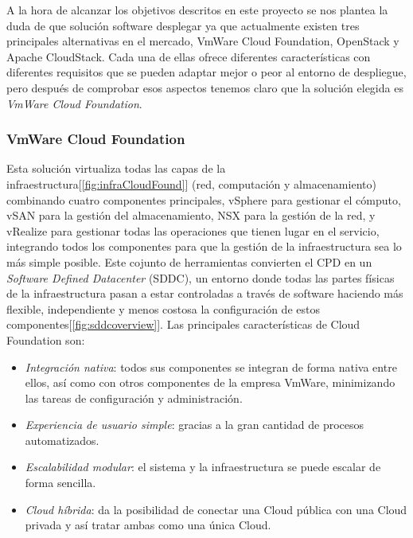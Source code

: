 A la hora de alcanzar los objetivos descritos en este proyecto se nos plantea la duda de que solución software desplegar ya que actualmente existen tres principales alternativas en el mercado, VmWare Cloud Foundation, OpenStack y Apache CloudStack. Cada una de ellas ofrece diferentes características con diferentes requisitos que se pueden adaptar mejor o peor al entorno de despliegue, pero después de comprobar esos aspectos tenemos claro que la solución elegida es \emph{VmWare Cloud Foundation}.

\subsubsection{VmWare Cloud Foundation}
Esta solución virtualiza todas las capas de la infraestructura[\ref{fig:infraCloudFound}] (red, computación y almacenamiento) combinando cuatro componentes principales, vSphere para gestionar el cómputo, vSAN para la gestión del almacenamiento, NSX para la gestión de la red, y vRealize para gestionar todas las operaciones que tienen lugar en el servicio, integrando todos los componentes para que la gestión de la infraestructura sea lo más simple posible. Este cojunto de herramientas convierten el CPD en un \emph{Software Defined Datacenter} (SDDC), un entorno donde todas las partes físicas de la infraestructura pasan a estar controladas a través de software haciendo más flexible, independiente y menos costosa la configuración de estos componentes[\ref{fig:sddcoverview}]. Las principales características de Cloud Foundation son:
\begin{itemize}
    \item \emph{Integración nativa}: todos sus componentes se integran de forma nativa entre ellos, así como con otros componentes de la empresa VmWare, minimizando las tareas de configuración y administración.
    \item \emph{Experiencia de usuario simple}: gracias a la gran cantidad de procesos automatizados.
    \item \emph{Escalabilidad modular}: el sistema y la infraestructura se puede escalar de forma sencilla.
    \item \emph{Cloud híbrida}: da la posibilidad de conectar una Cloud pública con una Cloud privada y así tratar ambas como una única Cloud.
\end{itemize}

